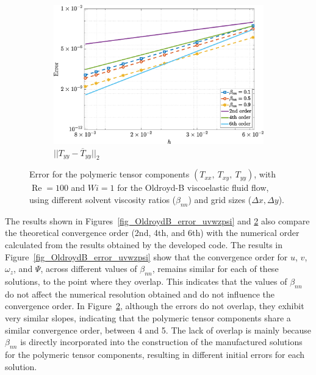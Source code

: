 \documentclass[preprint, 12pt]{elsarticle}
\begin{document}
\begin{figure}[H]
\begin{subfigure}[b]{.46\textwidth}
        \includegraphics[width=\textwidth]{NormErr_2nd_Re_100_Wi_1_epsilon_0_xi_0_alphaG_0_Dt_1e-06_at_0.05_tipsim_1_MMS_12_Tyy.eps}
        \caption{$||T_{yy} - \overline{T}_{yy}||_{2}$}
        \label{error_tyy_2nd_Case1_oldorydb}
    \end{subfigure}
    \vspace{0.02cm}
    \caption{Error for the polymeric tensor components $({T}_{xx},~{T}_{xy},~{T}_{yy})$, with $\operatorname{Re}=100$ and $Wi=1$ for the Oldroyd-B viscoelastic fluid flow, using different solvent viscosity ratios ($\beta_{nn}$) and grid sizes ($\Delta x, \Delta y$).\label{fig_OldroydB_error_txxxyyy}}
\end{figure}

The results shown in Figures~\ref{fig_OldroydB_error_uvwzpsi} and
\ref{fig_OldroydB_error_txxxyyy}  also compare the theoretical convergence
order (2nd, 4th, and 6th) with the numerical order calculated from the results
obtained by the developed code. The results in
Figure~\ref{fig_OldroydB_error_uvwzpsi} show that the convergence order for
$u$, $v$, $\omega_{z}$, and $\Psi$, across different values of $\beta_{nn}$,
remains similar for each of these solutions, to the point where they overlap.
This indicates that the values of $\beta_{nn}$ do not affect the numerical
resolution obtained and do not influence the convergence order. In
Figure~\ref{fig_OldroydB_error_txxxyyy}, although the errors do not overlap,
they exhibit very similar slopes, indicating that the polymeric tensor
components share a similar convergence order, between 4 and 5. The lack of
overlap is mainly because $\beta_{nn}$ is directly incorporated into the
construction of the manufactured solutions for the polymeric tensor components,
resulting in different initial errors for each solution.
\end{document}
